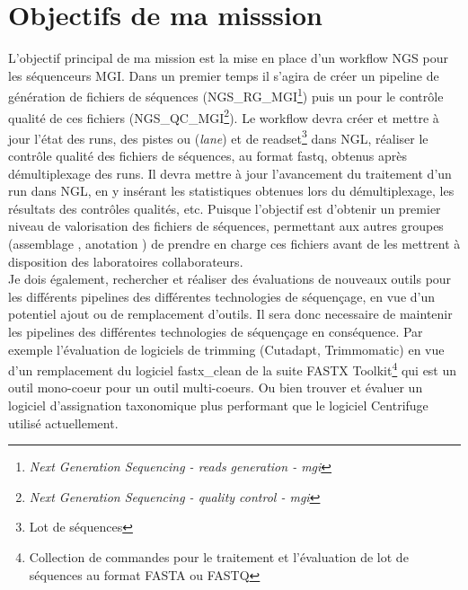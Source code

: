 \section{Objectifs de ma misssion}
L'objectif principal de ma mission est la mise en place d'un workflow NGS pour les séquenceurs MGI. Dans un premier temps il s'agira de créer un pipeline de génération de fichiers de séquences (NGS\_RG\_MGI\footnote{\emph{Next Generation Sequencing - reads generation - mgi}}) puis un pour le contrôle qualité de ces fichiers (NGS\_QC\_MGI\footnote{\emph{Next Generation Sequencing - quality control - mgi}}). Le workflow devra créer et mettre à jour l'état des runs, des pistes ou (\emph{lane}) et de readset\footnote{Lot de séquences} dans NGL, réaliser le contrôle qualité des fichiers de séquences, au format fastq, obtenus après démultiplexage des runs. Il devra mettre à jour l'avancement du traitement d'un run dans NGL, en y insérant les statistiques obtenues lors du démultiplexage, les résultats des contrôles qualités, etc. Puisque l'objectif est d'obtenir un premier niveau de valorisation des fichiers de séquences, permettant aux autres groupes (\og assemblage \fg{}, \og anotation \fg{}) de prendre en charge ces fichiers avant de les mettrent à disposition des laboratoires collaborateurs.\\

Je dois également, rechercher et réaliser des évaluations de nouveaux outils pour les différents pipelines des différentes technologies de séquençage, en vue d'un potentiel ajout ou de remplacement d'outils. Il sera donc necessaire de maintenir les pipelines des différentes technologies de séquençage en conséquence. Par exemple l'évaluation de logiciels de trimming (Cutadapt, Trimmomatic) en vue d'un remplacement du logiciel fastx\_clean de la suite FASTX Toolkit\footnote{Collection de commandes pour le traitement et l'évaluation de lot de séquences au format FASTA ou FASTQ} qui est un outil mono-coeur pour un outil multi-coeurs. Ou bien trouver et évaluer un logiciel d'assignation taxonomique plus performant que le logiciel Centrifuge utilisé actuellement.